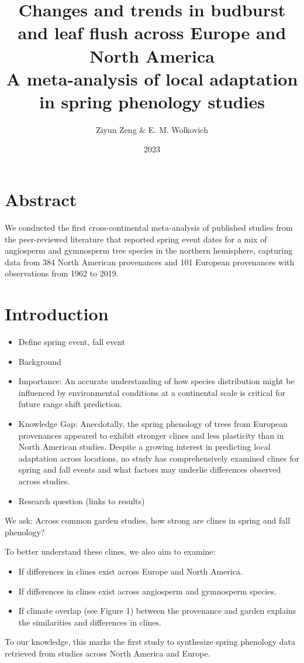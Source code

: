 \documentclass{article}
\begin{document}
\title{{\huge Changes and trends in budburst and leaf flush across Europe and North America} \\A meta-analysis of local adaptation in spring phenology studies}
\author{Ziyun Zeng \& E. M. Wolkovich}
\date{2023}
\maketitle 


\newpage

\section*{Abstract}


We conducted the first cross-continental meta-analysis of published studies from the peer-reviewed literature that reported spring event dates for a mix of angiosperm and gymnosperm tree species in the northern hemisphere, capturing data from 384 North American provenances and 101 European provenances with observations from 1962 to 2019.


\section{Introduction}
\begin{itemize}
\item Define spring event, fall event
\item Background
\item Importance: An accurate understanding of how species distribution might be influenced by environmental conditions at a continental scale is critical for future range shift prediction. 
\item Knowledge Gap: Anecdotally, the spring phenology of trees from European provenances appeared to exhibit stronger clines and less plasticity than in North American studies. Despite a growing interest in predicting local adaptation across locations, no study has comprehensively examined clines for spring and fall events and what factors may underlie differences observed across studies.
\item Research question (links to results)
\end{itemize}

We ask: Across common garden studies, how strong are clines in spring and fall phenology?

To better understand these clines, we also aim to examine:
\begin{itemize}
\item If differences in clines exist across Europe and North America.
\item If differences in clines exist across angiosperm and gymnosperm species.
\item If climate overlap (see Figure 1) between the provenance and garden explains the similarities and differences in clines.
\end{itemize}
To our knowledge, this marks the first study to synthesize spring phenology data retrieved from studies across North America and Europe. 
\end{document}
